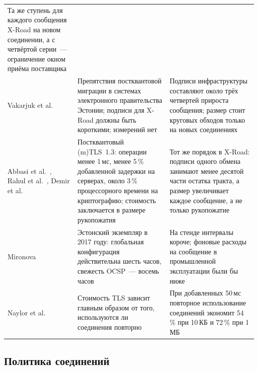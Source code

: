 \documentclass[conference,a4paper]{IEEEtran}
\newcommand{\newtext}[1]{{\color{blue}#1}}
\begin{document}
\begin{table}[!tb]
\begin{tabular}{@{}p{}p{}p{}@{}}
\newtext{Та же ступень для каждого сообщения X-Road на новом соединении, а с четвёртой серии~---
ограничение окном приёма поставщика} \\
\addlinespace
\newtext{Vakarjuk et al.~\cite{vakarjuk2024}} & \newtext{Препятствия постквантовой миграции в
системах электронного правительства Эстонии; подписи для X-Road должны быть короткими; измерений нет} &
\newtext{Подписи инфраструктуры составляют около трёх четвертей прироста сообщения;
размер стоит круговых обходов только на новых соединениях} \\
\addlinespace
\newtext{Abbasi et al.~\cite{abbasi2025}, Rahul et al.~\cite{rahul2026}, Demir et
al.~\cite{demir2026}} & \newtext{Постквантовый (m)TLS~1.3: операции менее 1\,мс, менее
5\,\% добавленной задержки на серверах, около 3\,\% процессорного времени на криптографию; стоимость заключается в
размере рукопожатия} & \newtext{Тот же порядок в X-Road: подписи одного обмена занимают менее
десятой части остатка тракта, а размер увеличивает каждое сообщение, а не только
рукопожатие} \\
\addlinespace
Mironova~\cite{mironova2017} & Эстонский экземпляр в 2017 году: глобальная конфигурация действительна шесть часов,
свежесть OCSP~--- восемь часов & На стенде интервалы короче; фоновые расходы на сообщение в
промышленной эксплуатации были бы ниже \\
\addlinespace
Naylor et al.~\cite{naylor2014} & Стоимость TLS зависит главным образом от того, используются ли соединения повторно &
При добавленных 50\,мс повторное использование соединений экономит 54\,\% при 10\,КБ и 72\,\% при 1\,МБ \\
\bottomrule
\end{tabular}
\end{table}

\subsection{Политика соединений}
\end{document}
